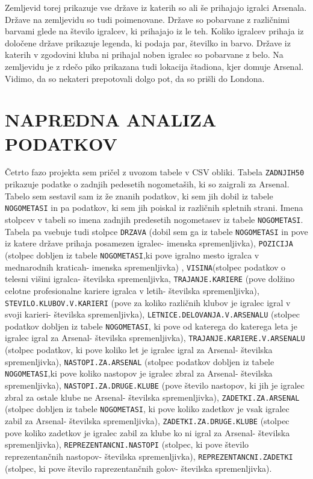 \documentclass[11pt,a4paper]{article}
\begin{document}
Zemljevid torej prikazuje vse države iz katerih so ali še prihajajo igralci Arsenala. Države na zemljevidu so tudi poimenovane. Države so pobarvane z različnimi barvami glede na število igralcev, ki prihajajo iz le teh. Koliko igralcev prihaja iz določene države prikazuje legenda, ki podaja par, številko in barvo. Države iz katerih v zgodovini kluba ni prihajal noben igralec so pobarvane z belo. Na zemljevidu je z rdečo piko prikazana tudi lokacija štadiona, kjer domuje Arsenal. Vidimo, da so nekateri prepotovali dolgo pot, da so prišli do Londona.



\section{NAPREDNA ANALIZA PODATKOV}
Četrto fazo projekta sem pričel z uvozom tabele v CSV obliki. Tabela \verb|ZADNJIH50| prikazuje podatke o zadnjih pedesetih nogometaših, ki so zaigrali za Arsenal. Tabelo sem sestavil sam iz že znanih podatkov, ki sem jih dobil iz tabele \verb|NOGOMETASI| in pa podatkov, ki sem jih poiskal iz različnih spletnih strani. Imena stolpcev v tabeli so imena zadnjih predesetih nogometasev iz tabele \verb|NOGOMETASI|. Tabela pa vsebuje tudi stolpce \verb|DRZAVA| (dobil sem ga iz tabele \verb|NOGOMETASI| in pove iz katere države prihaja posamezen igralec- imenska spremenljivka), \verb|POZICIJA| (stolpec dobljen iz tabele \verb|NOGOMETASI|,ki pove igralno mesto igralca v mednarodnih kraticah- imenska spremenljivka) , \verb|VISINA|(stolpec podatkov o telesni višini igralca- številska spremenljivka, \verb|TRAJANJE.KARIERE| (pove dolžino celotne profesionalne kariere igralca v letih- številska spremenljivka), \verb|STEVILO.KLUBOV.V.KARIERI| (pove za koliko različnih klubov je igralec igral v svoji karieri- številska spremenljivka), \verb|LETNICE.DELOVANJA.V.ARSENALU| (stolpec podatkov dobljen iz tabele \verb|NOGOMETASI|, ki pove od katerega do katerega leta je igralec igral za Arsenal- številska spremenljivka), \verb|TRAJANJE.KARIERE.V.ARSENALU| (stolpec podatkov, ki pove koliko let je igralec igral za Arsenal- številska spremenljivka), \verb|NASTOPI.ZA.ARSENAL| (stolpec podatkov dobljen iz tabele \texttt{NOGOME\-TA\-SI},ki pove koliko nastopov je igralec zbral za Arsenal- številska spremenljivka), \verb|NASTOPI.ZA.DRUGE.KLUBE| (pove število nastopov, ki jih je igralec zbral za ostale klube ne Arsenal- številska spremenljivka), \texttt{ZADETKI.ZA.AR\-SE\-NAL} (stolpec dobljen iz tabele \verb|NOGOMETASI|, ki pove koliko zadetkov je vsak igralec zabil za Arsenal- številska spremenljivka), \verb|ZADETKI.ZA.DRUGE.KLUBE| (stolpec pove koliko zadetkov je igralec zabil za klube ko ni igral za Arsenal- številska spremenljivka), \verb|REPREZENTANCNI.NASTOPI| (stolpec, ki pove število reprezentančnih nastopov- številska spremenljivka), \texttt{REPREZENTANCNI.ZA\-DET\-KI} (stolpec, ki pove število raprezentančnih golov- številska spremenljivka).
\end{document}
